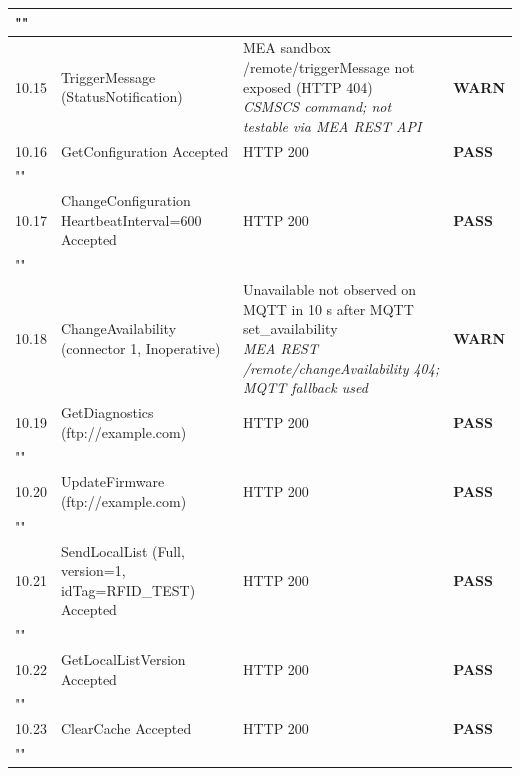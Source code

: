 \documentclass[10pt, a4paper]{article}
\begin{document}
\begin{longtable}{|L{1cm}|L{5.5cm}|M{7cm}|C{1.8cm}|}
\hline
{} \\
\hline
\small 10.15 & \small TriggerMessage (StatusNotification) & MEA sandbox /remote/triggerMessage not exposed (HTTP 404){\newline\normalfont\footnotesize\itshape CSMSCS command; not testable via MEA REST API} & \textcolor{warnorange}{\textbf{WARN}} \\
\hline
\small 10.16 & \small GetConfiguration  Accepted & HTTP 200 & \textcolor{passgreen}{\textbf{PASS}} \\
\hline
{} \\
\hline
\small 10.17 & \small ChangeConfiguration HeartbeatInterval=600  Accepted & HTTP 200 & \textcolor{passgreen}{\textbf{PASS}} \\
\hline
{} \\
\hline
\small 10.18 & \small ChangeAvailability (connector 1, Inoperative) & Unavailable not observed on MQTT in 10 s after MQTT set\_availability{\newline\normalfont\footnotesize\itshape MEA REST /remote/changeAvailability  404; MQTT fallback used} & \textcolor{warnorange}{\textbf{WARN}} \\
\hline
\small 10.19 & \small GetDiagnostics (ftp://example.com) & HTTP 200 & \textcolor{passgreen}{\textbf{PASS}} \\
\hline
{} \\
\hline
\small 10.20 & \small UpdateFirmware (ftp://example.com) & HTTP 200 & \textcolor{passgreen}{\textbf{PASS}} \\
\hline
{} \\
\hline
\small 10.21 & \small SendLocalList (Full, version=1, idTag=RFID\_TEST)  Accepted & HTTP 200 & \textcolor{passgreen}{\textbf{PASS}} \\
\hline
{} \\
\hline
\small 10.22 & \small GetLocalListVersion  Accepted & HTTP 200 & \textcolor{passgreen}{\textbf{PASS}} \\
\hline
{} \\
\hline
\small 10.23 & \small ClearCache  Accepted & HTTP 200 & \textcolor{passgreen}{\textbf{PASS}} \\
\hline
{} \\
\hline
\end{longtable}
\normalsize
\end{document}
